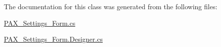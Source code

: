 The documentation for this class was generated from the following files\+:\begin{DoxyCompactItemize}
\item 
\mbox{\hyperlink{_p_a_x___settings___form_8cs}{P\+A\+X\+\_\+\+Settings\+\_\+\+Form.\+cs}}\item 
\mbox{\hyperlink{_p_a_x___settings___form_8_designer_8cs}{P\+A\+X\+\_\+\+Settings\+\_\+\+Form.\+Designer.\+cs}}\end{DoxyCompactItemize}
